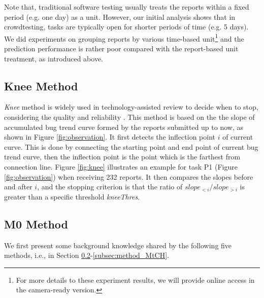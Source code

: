 \documentclass[sigconf,review, anonymous]{acmart}
\begin{document}


Note that, traditional software testing usually treats the reports within a fixed period (e.g. one day) as a unit. 
However, our initial analysis shows that in crowdtesting, tasks are typically open for shorter periods of time (e.g. 5 days). We did experiments on grouping reports by various time-based unit\footnote{For more details to these experiment results, we will provide online access in the camera-ready version.} and the prediction performance is rather poor compared with the report-based unit treatment, as introduced above.

\subsection{Knee Method}
\label{subsec:method_Knee}


\textit{Knee} method is widely used in technology-assisted review to decide when to stop, considering the quality and reliability \cite{Kneecormack2016engineering}.
This method is based on the the slope of accumulated bug trend curve formed by the reports submitted up to now, as shown in Figure \ref{fig:observation}. It first detects the inflection point $i$ of current curve.
This is done by connecting the starting point and end point of current bug trend curve, then the inflection point is the point which is the farthest from connection line. 
Figure \ref{fig:knee} illustrates an example for task P1 (Figure \ref{fig:observation}) when receiving 232 reports. 
It then compares the slopes before and after $i$, and the stopping criterion is that the ratio of $slope_{<i}/slope_{>i}$ is greater than a specific threshold \textit{kneeThres}.




\subsection{M0 Method}
\label{subsec:method_M0}

We first present some background knowledge shared by the following five methods, i.e., in Section \ref{subsec:method_M0}-\ref{subsec:method_MtCH}.
\end{document}
